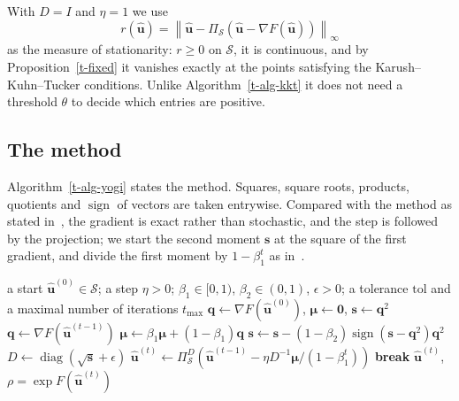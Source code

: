 \documentclass[11pt]{article}
\theoremstyle{plain}
\theoremstyle{remark}
\numberwithin{equation}{section}
\begin{document}
With $D=I$ and $\eta=1$ we use
\begin{equation}\label{t-r}
r\left(\widehat{\bm u}\right)=\left\|\widehat{\bm u}-\Pi_{\mathcal{S}}\left(\widehat{\bm u}-\nabla F\left(\widehat{\bm u}\right)\right)\right\|_\infty
\end{equation}
as the measure of stationarity: $r\ge 0$ on $\mathcal{S}$, it is continuous,
and by Proposition~\ref{t-fixed} it vanishes exactly at the points satisfying
the Karush--Kuhn--Tucker conditions. Unlike Algorithm~\ref{t-alg-kkt} it does
not need a threshold $\theta$ to decide which entries are positive.

\subsection{The method}

Algorithm~\ref{t-alg-yogi} states the method. Squares, square roots, products,
quotients and $\operatorname{sign}$ of vectors are taken entrywise. Compared
with the method as stated in~\cite{2018Zaheer_Yogi}, the gradient is exact
rather than stochastic, and the step is followed by the projection; we start
the second moment $\bm s$ at the square of the first gradient, and divide the
first moment by $1-\beta_1^t$ as in~\cite{2015Kingma_Ba}.

\begin{algorithm}[ht]
\caption{Projected Yogi}\label{t-alg-yogi}
\begin{algorithmic}[1]
\Require a start $\widehat{\bm u}^{(0)}\in\mathcal{S}$; a step $\eta>0$;
$\beta_1\in[0,1)$, $\beta_2\in(0,1)$, $\epsilon>0$; a tolerance $\mathrm{tol}$
and a maximal number of iterations $t_{\max}$
\State $\bm q\gets\nabla F\left(\widehat{\bm u}^{(0)}\right)$, $\bm \mu\gets\bm 0$, $\bm s\gets\bm q^2$
  \State $\bm q\gets\nabla F\left(\widehat{\bm u}^{(t-1)}\right)$
  \State $\bm\mu\gets\beta_1\bm\mu+(1-\beta_1)\bm q$
  \State $\bm s\gets\bm s-(1-\beta_2)\operatorname{sign}\left(\bm s-\bm q^2\right)\bm q^2$
  \State $D\gets\operatorname{diag}\left(\sqrt{\bm s}+\epsilon\right)$
  \State $\widehat{\bm u}^{(t)}\gets\Pi^D_{\mathcal{S}}\left(\widehat{\bm u}^{(t-1)}-\eta D^{-1}\bm\mu/\left(1-\beta_1^t\right)\right)$
    \State \textbf{break}
  \EndIf
\EndFor
\State \Return $\widehat{\bm u}^{(t)}$, $\rho=\exp F\left(\widehat{\bm u}^{(t)}\right)$
\end{algorithmic}
\end{algorithm}
\end{document}
